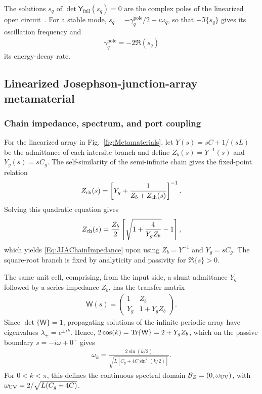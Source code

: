 \documentclass[prx,aps,twocolumn,article]{revtex4-2}
\newcommand{\msf}[1]{\mathsf{#1}}
\newcommand{\msY}{\msf{Y}}
\begin{document}
The solutions $s_q$ of
$\det\msY_{\mathrm{full}}(s_q)=0$ are the complex poles of the linearized
open circuit~\cite{Nigg:2012,Hassler:2019}. For a stable mode,
$s_q=-\gamma_q^{\mathrm{pole}}/2-i\omega_q$, so that
$-\Im\{s_q\}$ gives its oscillation frequency and
\begin{align}
    \gamma_q^{\mathrm{pole}}
    =
    -2\Re(s_q)
\end{align}
its energy-decay rate.

\subsection{Linearized Josephson-junction-array metamaterial}
\label{AppSec:JJAMetamaterial}

\subsubsection{Chain impedance, spectrum, and port coupling}

For the linearized array in Fig.~\ref{fig:Metamaterials}, let
$Y(s)=sC+1/(sL)$ be the admittance of each intersite branch and define
$Z_b(s)=Y^{-1}(s)$ and $Y_g(s)=sC_g$. The self-similarity of the
semi-infinite chain gives the fixed-point relation
\begin{align}
Z_{\rm ch}(s)
=
\left[
Y_g+\frac{1}{Z_b+Z_{\rm ch}(s)}
\right]^{-1}.
\end{align}
Solving this quadratic equation gives
\begin{align}
Z_{\rm ch}(s)
=
\frac{Z_b}{2}
\left[
\sqrt{1+\frac{4}{Y_gZ_b}}-1
\right],
\end{align}
which yields \cref{Eq:JJAChainImpedance} upon using
$Z_b=Y^{-1}$ and $Y_g=sC_g$. The square-root branch is fixed by
analyticity and passivity for $\Re \{s\}>0$.

The same unit cell, comprising, from the input side, a shunt admittance $Y_g$
followed by a series impedance $Z_b$, has the transfer matrix
\begin{align}
\mathsf W(s)
=
\begin{pmatrix}
1 & Z_b\\
Y_g & 1+Y_gZ_b
\end{pmatrix}.
\label{Eq:JJATransferMatrix}
\end{align}
Since $\det\{\mathsf W\}=1$, propagating solutions of the infinite periodic
array have eigenvalues $\lambda_\pm=e^{\pm ik}$. Hence,
$2\cos(k)=\Tr\{\mathsf W\}=2+Y_gZ_b$, which on the passive
boundary $s=-i\omega+0^+$ gives
\begin{align}
\omega_k
=
\frac{2\sin(k/2)}
{\sqrt{L[C_g+4C\sin^2(k/2)]}}.
\label{Eq:JJADispersion}
\end{align}
For $0<k<\pi$, this defines the continuous spectral domain
$\mathcal B_Z=(0,\omega_{\rm UV})$, with
$\omega_{\rm UV}=2/\sqrt{L(C_g+4C)}$.
\end{document}

